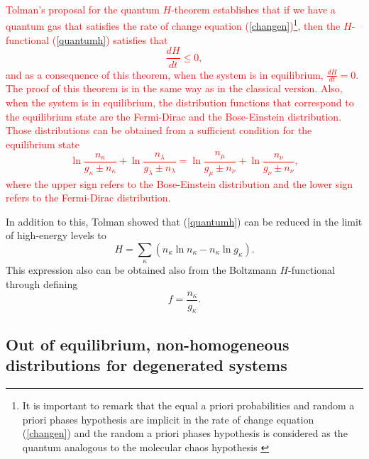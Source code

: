 \textcolor{red}{Tolman's proposal for the quantum $H$-theorem establishes that
if we have a quantum gas that satisfies the rate of change equation
(\ref{changen})\footnote{It is important to remark that the equal a priori
probabilities and random a priori phases hypothesis are implicit in the rate of
change equation (\ref{changen}) and the random a priori phases hypothesis is
considered as the quantum analogous to the molecular chaos hypothesis
\cite{bib:das2018}}, then the $H$-functional (\ref{quantumh}) satisfies that
%
\begin{equation}
    \frac{dH}{dt}\leq 0,
\end{equation}
%
and as a consequence of this theorem, when the system is in equilibrium,
$\frac{dH}{dt}=0$.\\
The proof of this theorem is in the same way as in the classical version. Also,
when the system is in equilibrium, the distribution functions that correspond
to the equilibrium state are the Fermi-Dirac and the Bose-Einstein
distribution. Those distributions can be obtained from a sufficient condition
for the equilibrium state
%
\begin{equation}
    \ln \frac{n_{\kappa}}{g_{\kappa}\pm n_{\kappa}}+\ln \frac{n_{\lambda}}{g_{\lambda}\pm n_{\lambda}}=\ln \frac{n_{\mu}}{g_{\mu}\pm n_{\nu}}+\ln \frac{n_{\nu}}{g_{\nu}\pm n_{\nu}},
\end{equation}
%
where the upper sign refers to the Bose-Einstein distribution and the lower
sign refers to the Fermi-Dirac distribution.}

In addition to this, Tolman showed that (\ref{quantumh}) can be reduced in the
limit of high-energy levels to
%
\begin{equation}
    H = \sum_{\kappa} (n_{\kappa} \ln n_{\kappa} - n_{\kappa} \ln g_{\kappa}). \label{reduce-h}
\end{equation}
%
This expression also can be obtained also from the Boltzmann $H$-functional through defining
%
\begin{equation}
    f=\frac{n_{\kappa}}{ g_{\kappa}}.
\end{equation}
%

\subsection{Out of equilibrium, non-homogeneous distributions for degenerated systems}

